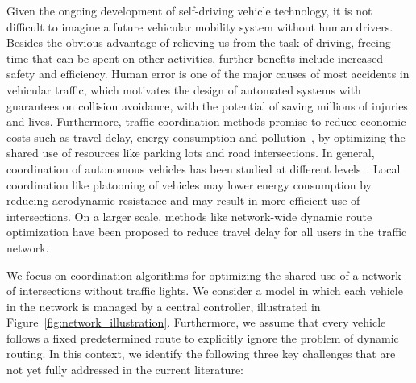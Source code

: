 \documentclass{article}
\theoremstyle{definition}
\theoremstyle{plain}
\begin{document}
Given the ongoing development of self-driving vehicle technology, it is not
difficult to imagine a future vehicular mobility system without human drivers.
Besides the obvious advantage of relieving us from the task of driving, freeing
time that can be spent on other activities, further benefits include
increased safety and efficiency. Human error is one of the major causes of most
accidents in vehicular traffic, which motivates the design of automated systems
with guarantees on collision avoidance, with the potential of saving millions of
injuries and lives. Furthermore, traffic coordination methods promise to reduce
economic costs such as travel delay, energy consumption and pollution~\cite{fagnantPreparingNationAutonomous2015}, by
optimizing the shared use of resources like parking lots and road intersections.
In general, coordination of autonomous vehicles has been studied at different
levels~\cite{marianiCoordinationAutonomousVehicles2022}. Local coordination like platooning of vehicles may lower energy
consumption by reducing aerodynamic resistance and may result in more efficient
use of intersections. On a larger scale, methods like network-wide dynamic route
optimization have been proposed to reduce travel delay for all users in the
traffic network.

We focus on coordination algorithms for optimizing the shared use of a network
of intersections without traffic lights. We consider a model in which each
vehicle in the network is managed by a central controller, illustrated in
Figure~\ref{fig:network_illustration}. Furthermore, we assume that every vehicle follows a
fixed predetermined route to explicitly ignore the problem of dynamic routing.
%
In this context, we identify the following three key challenges
that are not yet fully addressed in the current literature:
\end{document}
